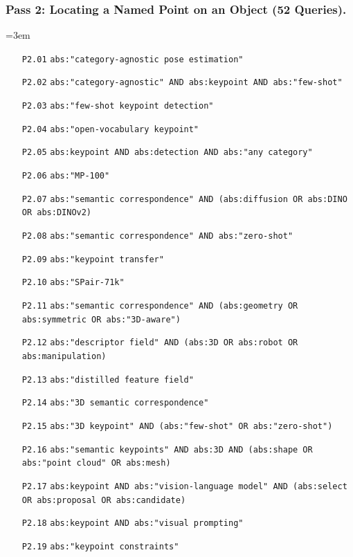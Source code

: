 \subsubsection{Pass 2: Locating a Named Point on an Object (52 Queries).}
{\footnotesize\raggedright\emergencystretch=3em\begin{itemize}\setlength{\itemsep}{0pt}\setlength{\parskip}{0pt}
\item[\texttt{P2.01}] \texttt{abs:"category-agnostic pose estimation"}
\item[\texttt{P2.02}] \texttt{abs:"category-agnostic" AND abs:keypoint AND abs:"few-shot"}
\item[\texttt{P2.03}] \texttt{abs:"few-shot keypoint detection"}
\item[\texttt{P2.04}] \texttt{abs:"open-vocabulary keypoint"}
\item[\texttt{P2.05}] \texttt{abs:keypoint AND abs:detection AND abs:"any category"}
\item[\texttt{P2.06}] \texttt{abs:"MP-100"}
\item[\texttt{P2.07}] \texttt{abs:"semantic correspondence" AND (abs:diffusion OR abs:DINO OR abs:DINOv2)}
\item[\texttt{P2.08}] \texttt{abs:"semantic correspondence" AND abs:"zero-shot"}
\item[\texttt{P2.09}] \texttt{abs:"keypoint transfer"}
\item[\texttt{P2.10}] \texttt{abs:"SPair-71k"}
\item[\texttt{P2.11}] \texttt{abs:"semantic correspondence" AND (abs:geometry OR abs:symmetric OR abs:"3D-aware")}
\item[\texttt{P2.12}] \texttt{abs:"descriptor field" AND (abs:3D OR abs:robot OR abs:manipulation)}
\item[\texttt{P2.13}] \texttt{abs:"distilled feature field"}
\item[\texttt{P2.14}] \texttt{abs:"3D semantic correspondence"}
\item[\texttt{P2.15}] \texttt{abs:"3D keypoint" AND (abs:"few-shot" OR abs:"zero-shot")}
\item[\texttt{P2.16}] \texttt{abs:"semantic keypoints" AND abs:3D AND (abs:shape OR abs:"point cloud" OR abs:mesh)}
\item[\texttt{P2.17}] \texttt{abs:keypoint AND abs:"vision-language model" AND (abs:select OR abs:proposal OR abs:candidate)}
\item[\texttt{P2.18}] \texttt{abs:keypoint AND abs:"visual prompting"}
\item[\texttt{P2.19}] \texttt{abs:"keypoint constraints"}

\end{itemize}}
